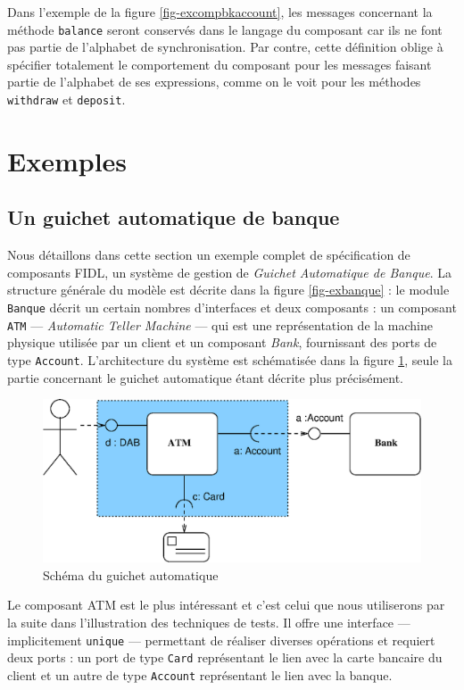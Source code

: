 Dans l'exemple de la figure \ref{fig-excompbkaccount}, les messages
concernant la m\'ethode \texttt{balance} seront conserv\'es dans le
langage du composant car ils ne font pas partie de l'alphabet de
synchronisation. Par contre, cette d\'efinition oblige \`a
sp\'ecifier totalement le comportement du composant pour les messages
faisant partie de l'alphabet de ses expressions, comme on le voit pour
les m\'ethodes \texttt{withdraw} et \texttt{deposit}.
    
\section{Exemples} 
\label{sec:exemples}
\subsection{Un guichet  automatique de banque}

Nous d\'etaillons dans cette section un exemple complet de
sp\'ecification de composants \textsf{FIDL}, un syst\`eme de gestion de
\emph{Guichet Automatique de Banque}. La structure g\'en\'erale du mod\`ele
est d\'ecrite dans la figure \ref{fig-exbanque} : le module
\texttt{Banque} d\'ecrit un certain nombres d'interfaces et deux
composants : un composant \texttt{ATM} --- \emph{Automatic Teller Machine}
--- qui est une repr\'esentation de la machine physique utilis\'ee
par un client et un composant \emph{Bank}, fournissant des ports de
type \texttt{Account}. L'architecture du syst\`eme est
sch\'ematis\'ee dans la figure \ref{fig-gab}, seule la partie
concernant le guichet automatique \'etant d\'ecrite plus pr\'ecis\'ement.

\begin{figure}[htbp]
    \centering
    \includegraphics[width=.8\textwidth]{figures/fig-gab.eps}    
    \caption{Sch\'ema du guichet automatique}
    \label{fig-gab}
\end{figure}

Le composant ATM est le plus int\'eressant et c'est celui que nous
utiliserons par la suite dans l'illustration des techniques de
tests. Il offre une interface --- implicitement \texttt{unique} ---
permettant de r\'ealiser diverses op\'erations et requiert deux
ports : un port de type \texttt{Card} repr\'esentant le lien avec la
carte bancaire du client et un autre de type \texttt{Account}
repr\'esentant le lien avec la banque.


